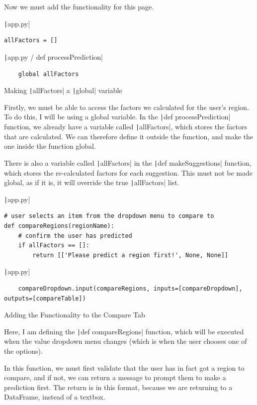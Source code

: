 \documentclass[12pt]{report}
\newcommand{\pil}[1]{\protect\texttt|#1|}
\begin{document}
Now we must add the functionality for this page.

\begin{listing}[H]
\pil{app.py}
\begin{verbatim}
allFactors = []
\end{verbatim}
\pil{app.py / def processPrediction}
\begin{verbatim}
    global allFactors
\end{verbatim}
\caption{Making \pil{allFactors} a \pil{global} variable}\label{cs:allFactorsGlobal}
\end{listing}

Firstly, we must be able to access the factors we calculated for the user's region. To do this, I will be using a global variable. In the \pil{def processPrediction} function, we already have a variable called \pil{allFactors}, which stores the factors that are calculated. We can therefore define it outside the function, and make the one inside the function global.

There is also a variable called \pil{allFactors} in the \pil{def makeSuggestions} function, which stores the re-calculated factors for each suggestion. This must not be made global, as if it is, it will override the true \pil{allFactors} list.

\begin{listing}[H]
\pil{app.py}
\begin{verbatim}
# user selects an item from the dropdown menu to compare to
def compareRegions(regionName):
    # confirm the user has predicted
    if allFactors == []:
        return [['Please predict a region first!', None, None]]
\end{verbatim}
\pil{app.py}
\begin{verbatim}
    compareDropdown.input(compareRegions, inputs=[compareDropdown], outputs=[compareTable])
\end{verbatim}
\caption{Adding the Functionality to the Compare Tab}\label{cs:compareFunctionality}
\end{listing}

Here, I am defining the \pil{def compareRegions} function, which will be executed when the value dropdown menu changes (which is when the user chooses one of the options).

In this function, we must first validate that the user has in fact got a region to compare, and if not, we can return a message to prompt them to make a prediction first. The return is in this format, because we are returning to a DataFrame, instead of a textbox.
\end{document}

